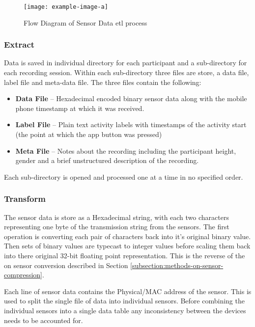 \begin{figure}[!hbt]
    \centering
    \texttt{[image: example-image-a]}
    \caption{Flow Diagram of Sensor Data \acrshort{etl} process}
    \label{fig:methods_sensor_ETL}
\end{figure}

\subsubsection{Extract} %
Data is saved in individual directory for each participant and a sub-directory for each recording session. Within each sub-directory three files are store, a data file, label file and meta-data file. The three files contain the following:
\begin{itemize}
    \item \textbf{Data File} -- Hexadecimal encoded binary sensor data along with the mobile phone timestamp at which it was received.
    \item \textbf{Label File} -- Plain text activity labels with timestamps of the activity start (the point at which the app button was pressed)
    \item \textbf{Meta File} -- Notes about the recording including the participant height, gender and a brief unstructured description of the recording.
\end{itemize}

Each sub-directory is opened and processed one at a time in no specified order.

\subsubsection{Transform}
The sensor data is store as a Hexadecimal string, with each two characters representing one byte of the transmission string from the sensors. The first operation is converting each pair of characters back into it's original binary value. Then sets of binary values are typecast to integer values before scaling them back into there original 32-bit floating point representation. This is the reverse of the on sensor conversion described in Section \ref{subsection:methods-on-sensor-compression}.

Each line of sensor data contains the Physical/MAC address of the sensor. This is used to split the single file of data into individual sensors. Before combining the individual sensors into a single data table any inconsistency between the devices needs to be accounted for.

